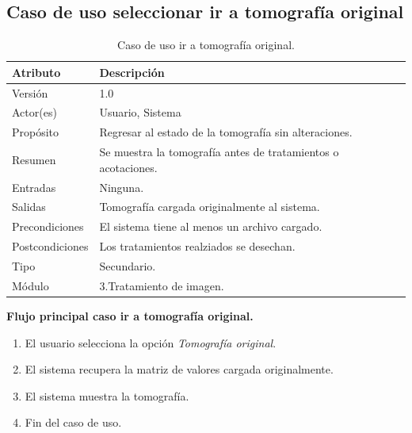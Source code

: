 \documentclass[12pt]{report}
\begin{document}
\subsection{Caso de uso seleccionar ir a tomografía original}
\begin{table}[H]
\begin{center}
\begin{tabular}{p{30mm}p{80mm}}
\hline
Atributo & Descripción\\
\hline \hline 
Versión & 1.0\\
Actor(es) & Usuario, Sistema\\
Propósito & Regresar al estado de la tomografía sin alteraciones.\\
Resumen & Se muestra la tomografía antes de tratamientos o acotaciones.\\
Entradas & Ninguna.\\
Salidas & Tomografía cargada originalmente al sistema.\\
Precondiciones & El sistema tiene al menos un archivo cargado.\\
Postcondiciones & Los tratamientos realziados se desechan.\\
Tipo & Secundario.\\
Módulo & 3.Tratamiento de imagen.\\
\hline \hline
\end{tabular}
\caption{Caso de uso ir a tomografía original.}
\end{center}
\end{table}

\textbf{Flujo principal caso ir a tomografía original. }
\begin{enumerate}
\item El usuario selecciona la opción \textit{Tomografía original}.
\item El sistema recupera la matriz de valores cargada originalmente.
\item El sistema muestra la tomografía.
\item Fin del caso de uso.
\end{enumerate}
\end{document}
